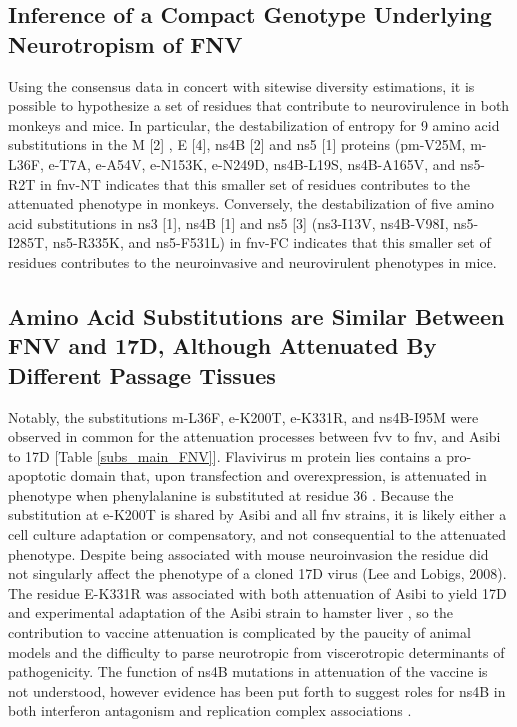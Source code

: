 \subsection{Inference of a Compact Genotype Underlying Neurotropism of FNV}
Using the consensus data in concert with sitewise diversity estimations, it is possible to hypothesize a set of residues that contribute to neurovirulence in both monkeys and mice. In particular, the destabilization of entropy for 9 amino acid substitutions in the M [2] , E [4], \gls{ns}4B [2] and \gls{ns}5 [1] proteins (\gls{pm}-V25M, \gls{m}-L36F, \gls{e}-T7A, \gls{e}-A54V, \gls{e}-N153K, \gls{e}-N249D, \gls{ns}4B-L19S, \gls{ns}4B-A165V, and \gls{ns}5-R2T in \gls{fnv}-NT indicates that this smaller set of residues contributes to the attenuated phenotype in monkeys. Conversely, the destabilization of five amino acid substitutions in \gls{ns}3 [1], \gls{ns}4B [1] and \gls{ns}5 [3] (\gls{ns}3-I13V, \gls{ns}4B-V98I, \gls{ns}5-I285T, \gls{ns}5-R335K, and \gls{ns}5-F531L) in \gls{fnv}-FC indicates that this smaller set of residues contributes to the neuroinvasive and neurovirulent phenotypes in mice. 

\subsection{Amino Acid Substitutions are Similar Between FNV and 17D, Although Attenuated By Different Passage Tissues}
Notably, the substitutions \gls{m}-L36F, \gls{e}-K200T, \gls{e}-K331R, and \gls{ns}4B-I95M were observed in common for the attenuation processes between \gls{fvv} to \gls{fnv}, and Asibi to 17D [Table \ref{subs_main_FNV}]. Flavivirus \gls{m} protein lies contains a pro-apoptotic domain that, upon transfection and overexpression, is attenuated in phenotype when phenylalanine is substituted at residue 36 \parencite{Catteau:2003dl}. Because the substitution at \gls{e}-K200T is shared by Asibi and all \gls{fnv} strains, it is likely either a cell culture adaptation or compensatory, and not consequential to the attenuated phenotype. Despite being associated with mouse neuroinvasion the residue did not singularly affect the phenotype of a cloned 17D virus (Lee and Lobigs, 2008). The residue E-K331R was associated with both attenuation of Asibi to yield 17D and experimental adaptation of the Asibi strain to hamster liver \parencite{McArthur:2003fv}, so the contribution to vaccine attenuation is complicated by the paucity of animal models and the difficulty to parse neurotropic from viscerotropic determinants of pathogenicity. The function of \gls{ns}4B mutations in attenuation of the vaccine is not understood, however evidence has been put forth to suggest roles for \gls{ns}4B in both interferon antagonism and replication complex associations \parencite{Zou:2014ku,MunozJordan:2005ia}. 

